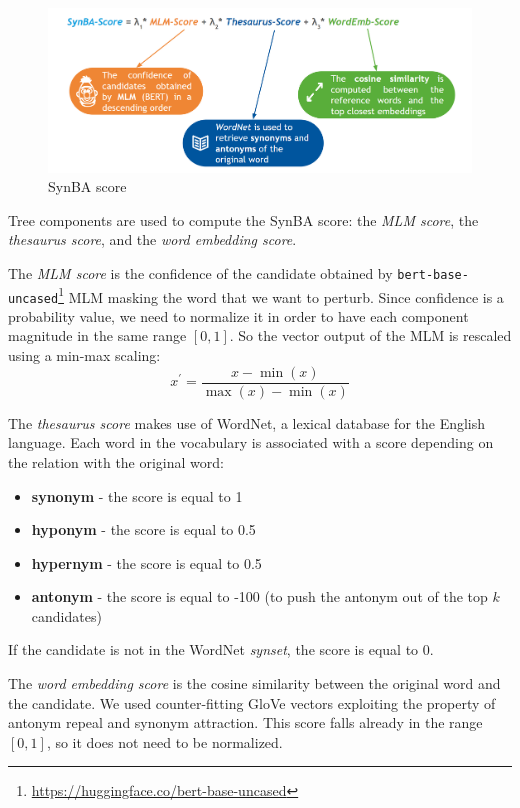 \begin{figure}[h]
    \centering
    \includegraphics[width=0.8\linewidth]{images/3_3_synba_score.png}
    \caption{SynBA score}
    \label{fig:3_3_synba_score}
\end{figure}

Tree components are used to compute the SynBA score: the \emph{MLM score}, the \emph{thesaurus score}, and the \emph{word embedding score}.

The \emph{MLM score} is the confidence of the candidate obtained by \texttt{bert-base-uncased}\footnote{\url{https://huggingface.co/bert-base-uncased}} MLM masking the word that we want to perturb.
Since confidence is a probability value, we need to normalize it in order to have each component magnitude in the same range $[0,1]$.
So the vector output of the MLM is rescaled using a min-max scaling:
\begin{equation}
    x^\prime = \frac{x - \min(x)}{\max(x) - \min(x)}
\end{equation}

The \emph{thesaurus score} makes use of WordNet, a lexical database for the English language. Each word in the vocabulary is associated with a score depending on the relation with the original word:
\begin{itemize}
    \item \textbf{synonym} - the score is equal to 1
    \item \textbf{hyponym} - the score is equal to 0.5
    \item \textbf{hypernym} - the score is equal to 0.5
    \item \textbf{antonym} - the score is equal to -100 (to push the antonym out of the top $k$ candidates)
\end{itemize}
If the candidate is not in the WordNet \emph{synset}, the score is equal to 0.

The \emph{word embedding score} is the cosine similarity between the original word and the candidate. We used counter-fitting GloVe vectors \cite{conf/naacl/MrksicSTGRSVWY16} exploiting the property of antonym repeal and synonym attraction. 
This score falls already in the range $[0,1]$, so it does not need to be normalized.

